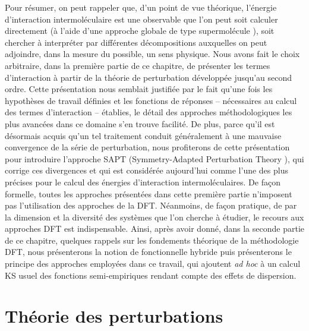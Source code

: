 \documentclass[12pt,a4paper]{book}
\begin{document}
	
	Pour résumer, on peut rappeler que, d’un point de vue théorique, l’énergie d’interaction intermoléculaire est une observable que l’on peut soit calculer directement (à l’aide d’une approche globale de type \og supermolécule \fg), soit chercher à interpréter par différentes décompositions auxquelles on peut adjoindre, dans la mesure du possible, un sens physique. Nous avons fait le choix arbitraire, dans la première partie de ce chapitre, de présenter les termes d’interaction à partir de la théorie de perturbation développée jusqu’au second ordre. Cette présentation nous semblait justifiée par le fait qu’une fois les hypothèses de travail définies et les fonctions de réponses -- nécessaires au calcul des termes d’interaction -- établies, le détail des approches méthodologiques les plus avancées dans ce domaine s’en trouve facilité. De plus, parce qu’il est désormais acquis qu’un tel traitement conduit généralement à une mauvaise convergence de la série de perturbation, nous profiterons de cette présentation pour introduire l’approche SAPT (\og Symmetry-Adapted Perturbation Theory \fg), qui corrige ces divergences et qui est considérée aujourd’hui comme l’une des plus précises pour le calcul des énergies d’interaction intermoléculaires. 
	De façon formelle, toutes les approches présentées dans cette première partie n’imposent pas l’utilisation des approches de la DFT. Néanmoins, de façon pratique, de par la dimension et la diversité des systèmes que l’on cherche à étudier, le recours aux approches DFT est indispensable. Ainsi, après avoir donné, dans la seconde partie de ce chapitre, quelques rappels sur les fondements théorique de la méthodologie DFT, nous présenterons la notion de fonctionnelle hybride puis présenterons le principe des approches employées dans ce travail, qui ajoutent \textit{ad hoc} à un calcul KS usuel des fonctions semi-empiriques rendant compte des effets de dispersion.\\
	
	
	
	
	
	
	
	
	
	
	
	
	\section[Théorie des perturbations]{Théorie des perturbations}
	
\end{document}
